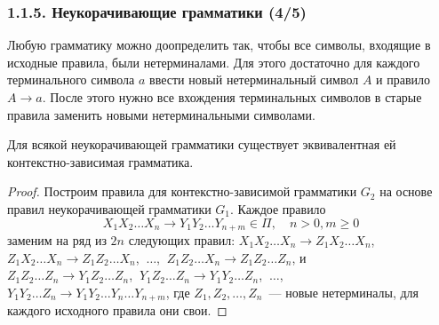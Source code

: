 \begin{frame}
\frametitle{1.1.5. Неукорачивающие грамматики (4/5)}

\begin{remark}
Любую грамматику можно доопределить так, 
чтобы все символы, входящие в исходные правила, были нетерминалами.
Для этого достаточно
для каждого терминального символа
$a$ ввести новый нетерминальный символ
$A$ и правило $A\to a$. После этого
нужно все вхождения терминальных
символов
в старые правила заменить 
новыми нетерминальными символами.
\end{remark}



\begin{theorem}
Для всякой неукорачивающей грамматики существует эквивалентная ей \\контекстно-зависимая грамматика.
\end{theorem}

\begin{proof}
Построим правила для контекстно-зависимой
грамматики $G_2$ на основе правил
неукорачивающей грамматики $G_1$.
Каждое правило 
$$X_1 X_2 \ldots X_n \to Y_1 Y_2 \ldots Y_{n+m} \in \Pi,\quad n > 0, m \geq 0$$
заменим на ряд из $2n$ следующих правил:
$X_1 X_2 \dots X_n \rightarrow Z_1 X_2 \dots X_n$,
\\
$Z_1 X_2 \dots X_n \rightarrow Z_1 Z_2 \dots X_n$,
$\ \dots$,
$\ Z_1 Z_2 \dots X_n \rightarrow Z_1 Z_2 \dots Z_n$,
и \\
$Z_1 Z_2 \dots Z_n \rightarrow Y_1 Z_2 \dots Z_n$, $\ Y_1 Z_2 \dots Z_n \rightarrow Y_1 Y_2 \dots Z_n$,
$\ \dots$,\\
$Y_1 Y_2 \dots Z_n \rightarrow Y_1 Y_2 \dots Y_n \dots Y_{n+m}$,
где $Z_1, Z_2, \dots, Z_n$~--- новые нетерминалы, 
для каждого исходного правила они свои.
\end{proof}
\end{frame}

